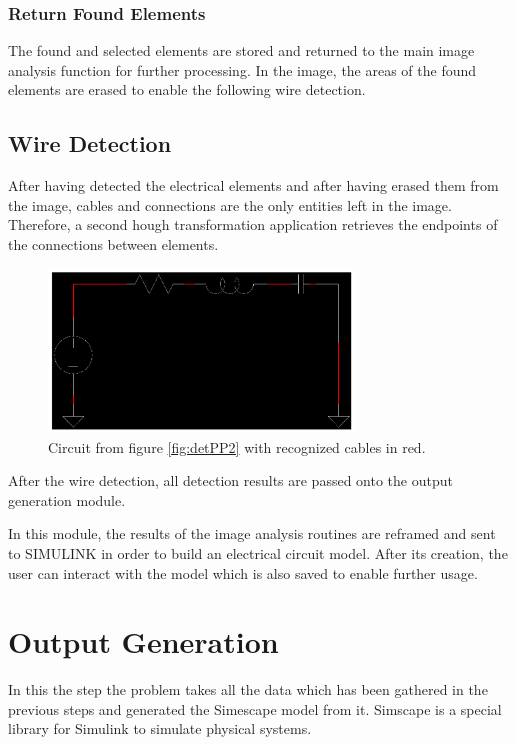 \documentclass[10pt,twocolumn,letterpaper]{article}
\begin{document}
\subsubsection*{Return Found Elements}

The found and selected elements are stored and returned to the main image analysis function for further processing. In the image, the areas of the found elements are erased to enable the following wire detection.

\subsection{Wire Detection}
\label{subsec:wire}

After having detected the electrical elements and after having erased them from the image, cables and connections are the only entities left in the image. Therefore, a second hough transformation application retrieves the endpoints of the connections between elements.
\par

\begin{figure}[!ht]
\includegraphics[width = 3.2in]{img/connections_after.png}
\caption{Circuit from figure \ref{fig:detPP2} with recognized cables in red.}
\label{fig:c10}
\end{figure}

\par
After the wire detection, all detection results are passed onto the output generation module.


\label{sec:output}

In this module, the results of the image analysis routines are reframed and sent to SIMULINK in order to build an electrical circuit model. After its creation, the user can interact with the model which is also saved to enable further usage.

\section{Output Generation}
In this the step the problem takes all the data which has been gathered in the previous steps and generated the Simescape model from it. Simscape is a special library for Simulink to simulate physical systems.
\end{document}
